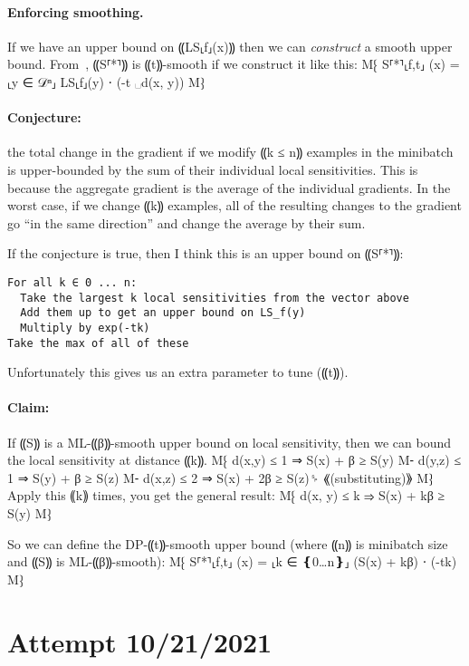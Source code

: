 \documentclass{article}
\begin{document}
\paragraph{Enforcing smoothing.}
If we have an upper bound on ⸨LS⸤f⸥(x)⸩ then we can \emph{construct} a
smooth upper bound. From~\cite{smooth-sensitivity}, ⸨S⸢*⸣⸩ is
⸨t⸩-smooth if we construct it like this:
%
M⁅ S⸢*⸣⸤f,t⸥ (x) = \max⸤y ∈ 𝒟ⁿ⸥ LS⸤f⸥(y) ⋅ \exp(-t ␣d(x, y))
M⁆

\paragraph{Conjecture:} the total change in the gradient if we modify
⸨k ≤ n⸩ examples in the minibatch is upper-bounded by the sum of their
individual local sensitivities. This is because the aggregate gradient
is the average of the individual gradients. In the worst case, if we
change ⸨k⸩ examples, all of the resulting changes to the gradient go
``in the same direction'' and change the average by their sum.


If the conjecture is true, then I think this is an upper bound on ⸨S⸢*⸣⸩:

\begin{verbatim}
For all k ∈ 0 ... n:
  Take the largest k local sensitivities from the vector above
  Add them up to get an upper bound on LS_f(y)
  Multiply by exp(-tk)
Take the max of all of these
\end{verbatim}

Unfortunately this gives us an extra parameter to tune (⸨t⸩).

\paragraph{Claim:} If ⸨S⸩ is a ML-⸨β⸩-smooth upper bound on local
sensitivity, then we can bound the local sensitivity at distance ⸨k⸩.
%
M⁅ d(x,y) ≤ 1 ⇒ S(x) + β ≥ S(y)
M⁃ d(y,z) ≤ 1 ⇒ S(y) + β ≥ S(z)
M⁃ d(x,z) ≤ 2 ⇒ S(x) + 2β ≥ S(z)␠ ⟪(substituting)⟫
M⁆
%
Apply this ⸨k⸩ times, you get the general result:
%
M⁅ d(x, y) ≤ k ⇒ S(x) + kβ ≥ S(y)
M⁆

So we can define the DP-⸨t⸩-smooth upper bound (where ⸨n⸩ is minibatch size
and ⸨S⸩ is ML-⸨β⸩-smooth):
%
M⁅ S⸢*⸣⸤f,t⸥ (x) = \max⸤k ∈ ❴0…n❵⸥ (S(x) + kβ) ⋅ \exp(-tk)
M⁆


\section{Attempt 10/21/2021}
\end{document}
